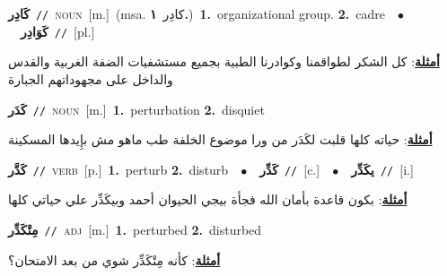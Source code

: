 \documentclass[10pt,a4paper,twoside]{article} %
\begin{document}
\begin{multicols}{2}
{\setlength\topsep{0pt}\textbf{\foreignlanguage{arabic}{كَادِر}}\ {\color{gray}\texttt{//}\color{black}}\ \textsc{noun}\ [m.]\ \color{gray}(msa. \foreignlanguage{arabic}{كادِر}~\foreignlanguage{arabic}{\textbf{١.}})\color{black}\ \textbf{1.}~organizational group.  \textbf{2.}~cadre\ \ $\bullet$\ \ \setlength\topsep{0pt}\textbf{\foreignlanguage{arabic}{كَوَادِر}}\ {\color{gray}\texttt{//}\color{black}}\ [pl.]\  \begin{flushright}\color{gray}\foreignlanguage{arabic}{\textbf{\underline{\foreignlanguage{arabic}{أمثلة}}}: كل الشكر لطواقمنا وكوادرنا الطبية بجميع مستشفيات الضفة الغربية والقدس والداخل على مجهوداتهم الجبارة}\end{flushright}\color{black}} \vspace{2mm}

{\setlength\topsep{0pt}\textbf{\foreignlanguage{arabic}{كَدَر}}\ {\color{gray}\texttt{//}\color{black}}\ \textsc{noun}\ [m.]\ \textbf{1.}~perturbation  \textbf{2.}~disquiet\  \begin{flushright}\color{gray}\foreignlanguage{arabic}{\textbf{\underline{\foreignlanguage{arabic}{أمثلة}}}: حياته كلها قلبت لكَدَر من ورا موضوع الخلفة طب ماهو مش بإِيدها المسكينة}\end{flushright}\color{black}} \vspace{2mm}

{\setlength\topsep{0pt}\textbf{\foreignlanguage{arabic}{كَدَّر}}\ {\color{gray}\texttt{//}\color{black}}\ \textsc{verb}\ [p.]\ \textbf{1.}~perturb  \textbf{2.}~disturb\ \ $\bullet$\ \ \setlength\topsep{0pt}\textbf{\foreignlanguage{arabic}{كَدِّر}}\ {\color{gray}\texttt{//}\color{black}}\ [c.]\ \ $\bullet$\ \ \setlength\topsep{0pt}\textbf{\foreignlanguage{arabic}{يكَدِّر}}\ {\color{gray}\texttt{//}\color{black}}\ [i.]\  \begin{flushright}\color{gray}\foreignlanguage{arabic}{\textbf{\underline{\foreignlanguage{arabic}{أمثلة}}}: بكون قاعدة بأمان الله فجأة بيجي الحيوان أحمد وبيكَدِّر علي حياتي كلها}\end{flushright}\color{black}} \vspace{2mm}

{\setlength\topsep{0pt}\textbf{\foreignlanguage{arabic}{مِتْكَدِّر}}\ {\color{gray}\texttt{//}\color{black}}\ \textsc{adj}\ [m.]\ \textbf{1.}~perturbed  \textbf{2.}~disturbed\  \begin{flushright}\color{gray}\foreignlanguage{arabic}{\textbf{\underline{\foreignlanguage{arabic}{أمثلة}}}: كأنه مِتْكَدِّر شوي من بعد الامتحان؟}\end{flushright}\color{black}} \vspace{2mm}


\end{multicols}
\end{document}
